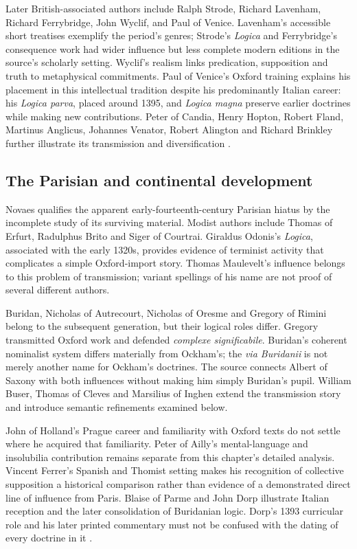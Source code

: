 Later British-associated authors include Ralph Strode, Richard Lavenham,
Richard Ferrybridge, John Wyclif, and Paul of Venice.
Lavenham's accessible short treatises exemplify the period's genres;
Strode's \emph{Logica} and Ferrybridge's consequence work had wider
influence but less complete modern editions in the source's scholarly
setting. Wyclif's realism links predication, supposition and truth to
metaphysical commitments. Paul of Venice's Oxford training explains his
placement in this intellectual tradition despite his predominantly Italian
career: his \emph{Logica parva}, placed around 1395, and \emph{Logica magna}
preserve earlier doctrines while making new contributions.
Peter of Candia, Henry Hopton, Robert Fland, Martinus Anglicus,
Johannes Venator, Robert Alington and Richard Brinkley further illustrate
its transmission and diversification
\cite[pp.~437--443]{DutilhNovaes2007FordhamChapter8}.

\subsection{The Parisian and continental development}

Novaes qualifies the apparent early-fourteenth-century Parisian hiatus by
the incomplete study of its surviving material. Modist authors include
Thomas of Erfurt, Radulphus Brito and Siger of Courtrai.
Giraldus Odonis's \emph{Logica}, associated with the early 1320s, provides
evidence of terminist activity that complicates a simple Oxford-import
story. Thomas Maulevelt's influence belongs to this problem of transmission;
variant spellings of his name are not proof of several different authors.

Buridan, Nicholas of Autrecourt, Nicholas of Oresme and Gregory of Rimini
belong to the subsequent generation, but their logical roles differ.
Gregory transmitted Oxford work and defended \emph{complexe significabile}.
Buridan's coherent nominalist system differs materially from Ockham's;
the \emph{via Buridanii} is not merely another name for Ockham's doctrines.
The source connects Albert of Saxony with both influences without making
him simply Buridan's pupil. William Buser, Thomas of Cleves and Marsilius
of Inghen extend the transmission story and introduce semantic refinements
examined below.

John of Holland's Prague career and familiarity with Oxford texts do not
settle where he acquired that familiarity. Peter of Ailly's mental-language
and insolubilia contribution remains separate from this chapter's detailed
analysis. Vincent Ferrer's Spanish and Thomist setting makes his recognition
of collective supposition a historical comparison rather than evidence of
a demonstrated direct line of influence from Paris. Blaise of Parme and
John Dorp illustrate Italian reception and the later consolidation of
Buridanian logic. Dorp's 1393 curricular role and his later printed
commentary must not be confused with the dating of every doctrine in it
\cite[pp.~443--448]{DutilhNovaes2007FordhamChapter8}.

